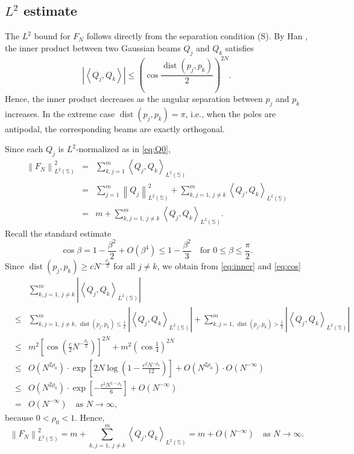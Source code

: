 \documentclass[12pt,reqno]{amsart}
\DeclareMathOperator{\dist}{dist}
\newcommand{\Sb}{\mathbb{S}}
\theoremstyle{plain}
\theoremstyle{definition}
\theoremstyle{remark}
\numberwithin{equation}{section}
\begin{document}
\subsection{$L^2$ estimate}\label{sec:FL}
The $L^2$ bound for $F_N$ follows directly from the separation condition (S).  
By Han \cite[Lemma 5]{Ha1}, the inner product between two Gaussian beams $Q_j$ and $Q_k$ satisfies
\begin{equation}\label{eq:inner}
\left|\left\langle Q_j,Q_k\right\rangle\right|\le\left(\cos\frac{\dist\left(p_j,p_k\right)}{2}\right)^{2N}.
\end{equation}
Hence, the inner product decreases as the angular separation between $p_j$ and $p_k$ increases. In the extreme case $\dist(p_j,p_k)=\pi$, i.e., when the poles are antipodal, the corresponding beams are exactly orthogonal.

Since each $Q_j$ is $L^2$-normalized as in \eqref{eq:Q0},
\begin{eqnarray*}
\left\|F_N\right\|_{L^2(\Sb)}^2&=&\sum_{k,j=1}^m\left\langle Q_j,Q_k\right\rangle_{L^2(\Sb)}\\
&=&\sum_{j=1}^m\left\|Q_j\right\|_{L^2(\Sb)}^2+\sum_{k,j=1,\,j\ne k}^m\left\langle Q_j,Q_k\right\rangle_{L^2(\Sb)}\\
&=&m+\sum_{k,j=1,\,j\ne k}^m\left\langle Q_j,Q_k\right\rangle_{L^2(\Sb)}.
\end{eqnarray*}
Recall the standard estimate
\begin{equation}\label{eq:cos}
\cos\beta=1-\frac{\beta^2}{2}+O\left(\beta^4\right)\le1-\frac{\beta^2}{3}\quad\text{for }0\le\beta\le\frac\pi2.
\end{equation}
Since $\dist\left(p_j,p_k\right)\ge cN^{-\frac{\rho_0}{2}}$ for all $j\ne k$, we obtain from \eqref{eq:inner} and \eqref{eq:cos}
\begin{eqnarray*}
&&\sum_{k,j=1,\,j\ne k}^m\left|\left\langle Q_j,Q_k\right\rangle_{L^2(\Sb)}\right|\\
&\le&\sum_{k,j=1,\,j\ne k,\,\dist\left(p_j,p_k\right)\le\frac12}^m\left|\left\langle Q_j,Q_k\right\rangle_{L^2(\Sb)}\right|
+\sum_{k,j=1,\,\dist\left(p_j,p_k\right)>\frac12}^m\left|\left\langle Q_j,Q_k\right\rangle_{L^2(\Sb)}\right|\\
&\le&m^2\left[\cos\left(\frac c2N^{-\frac{\rho_0}{2}}\right)\right]^{2N}+m^2\left(\cos\frac14\right)^{2N}\\
&\le&O\left(N^{2\rho_0}\right)\cdot\exp\left[2N\log\left(1-\frac{c^2N^{-\rho_0}}{12}\right)\right]+O\left(N^{2\rho_0}\right)\cdot O\left(N^{-\infty}\right)\\
&\le&O\left(N^{2\rho_0}\right)\cdot\exp\left[-\frac{c^2N^{1-\rho_0}}{6}\right]+O\left(N^{-\infty}\right)\\
&=&O\left(N^{-\infty}\right)\quad\text{as }N\to\infty,
\end{eqnarray*}
because $0<\rho_0<1$. Hence,
\begin{equation}\label{eq:FL}
\left\|F_N\right\|_{L^2(\Sb)}^2=m+\sum_{k,j=1,\,j\ne k}^m\left\langle Q_j,Q_k\right\rangle_{L^2(\Sb)}=m+O\left(N^{-\infty}\right)\quad\text{as }N\to\infty.
\end{equation}
\end{document}
